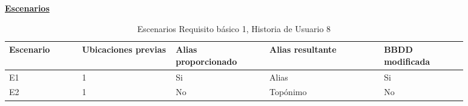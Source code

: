 \documentclass[../ei103948-project-documentation.tex]{subfiles}
\begin{document}
					\begin{center}
					\textbf{\underline{Escenarios}}
					\begin{table}[H]
						\centering
						\begin{tabular}{|p{0.14\linewidth}|p{0.18\linewidth}|p{0.18\linewidth}|p{0.22\linewidth}|p{0.16\linewidth}|}
							\hline
							\textbf{Escenario} & \textbf{Ubicaciones previas} & \textbf{Alias proporcionado} & \textbf{Alias resultante} & \textbf{BBDD modificada} \\ \hline
							E1                 & 1                        & Si                           & Alias                     & Si                       \\ \hline
							E2                 & 1                        & No                           & Topónimo                  & No                       \\ \hline
							\end{tabular}
						\caption{Escenarios Requisito básico 1, Historia de Usuario 8}
					\end{table}

					\descripcionBasicaH

					\newpage


\end{center}
\end{document}
